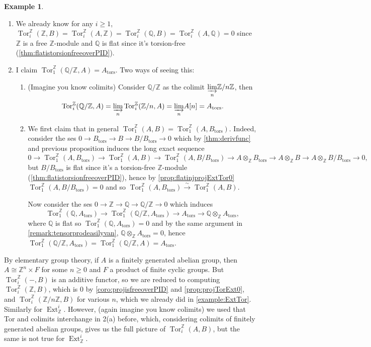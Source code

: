 \documentclass{article}
\newcommand{\Z}{\mathbb{Z}}
\newcommand{\Q}{\mathbb{Q}}
\newcommand{\tors}{{\operatorname{tors}}}
\newcommand{\Tor}{\operatorname{Tor}}
\newcommand{\Ext}{\operatorname{Ext}}
\theoremstyle{definition}
\newtheorem{example}[defn]{Example}
\begin{document}
\begin{example}
\begin{enumerate}
\item We already know for any $i\geq 1$, $\Tor_i^\Z(\Z,B)=\Tor_i^\Z(A,\Z)=\Tor_i^\Z(\Q,B)=\Tor_i^\Z(A,\Q)=0$ since $\Z$ is a free $\Z$-module and $\Q$ is flat since it's torsion-free (\ref{thm:flatistorsionfreeoverPID}).
\item I claim $\Tor_1^\Z(\Q/\Z,A)=A_\tors$. Two ways of seeing this:
\begin{enumerate}
\item (Imagine you know colimits) Consider $\Q/\Z$ as the colimit $\underset{n}{\varinjlim}\Z/n\Z$, then
\[
\Tor_i^\Z(\Q/\Z,A)=\underset{n}{\varinjlim}\Tor_i^\Z(\Z/n,A)=\underset{n}{\varinjlim}A[n]=A_\tors.
\]
\item We first claim that in general $\Tor_1^\Z(A,B)=\Tor_1^\Z(A,B_\tors)$. Indeed, consider the ses $0\rightarrow B_\tors\rightarrow B\rightarrow B/B_\tors \rightarrow 0$ which by \ref{thm:derivfunc} and previous proposition induces the long exact sequence
\[
0\rightarrow \Tor_1^\Z(A,B_\tors) \rightarrow \Tor_1^\Z(A,B) \rightarrow\Tor_1^\Z(A,B/B_\tors) \rightarrow A\otimes_\Z B_\tors \rightarrow A\otimes_\Z B\rightarrow A\otimes_\Z B/B_\tors \rightarrow 0,
\]
but $B/B_\tors$ is flat since it's a torsion-free $\Z$-module (\ref{thm:flatistorsionfreeoverPID}), hence by \ref{prop:flatinjprojExtTor0} $\Tor_1^\Z(A,B/B_\tors)=0$ and so $\Tor_1^\Z(A,B_\tors) \xrightarrow{\sim} \Tor_1^\Z(A,B)$.

Now consider the ses $0\rightarrow\Z\rightarrow\Q\rightarrow\Q/\Z\rightarrow 0$ which induces
\[
\Tor_1^\Z(\Q,A_\tors)\rightarrow\Tor_1^\Z(\Q/\Z,A_\tors)\rightarrow A_\tors\rightarrow \Q\otimes_\Z A_\tors,
\]
where $\Q$ is flat so $\Tor_1^\Z(\Q,A_\tors)=0$ and by the same argument in \ref{remark:tensorprodeasilyvan}, $\Q\otimes_\Z A_\tors=0$, hence $\Tor_1^\Z(\Q/\Z,A_\tors)=\Tor_1^\Z(\Q/\Z,A)=A_\tors$.
\end{enumerate}
\end{enumerate}
\end{example}

By elementary group theory, if $A$ is a finitely generated abelian group, then $A\cong\Z^n\times F$ for some $n\geq 0$ and $F$ a product of finite cyclic groups. But $\Tor_i^\Z(-,B)$ is an additive functor, so we are reduced to computing $\Tor_i^\Z(\Z,B)$, which is 0 by \ref{coro:projisfreeoverPID} and \ref{prop:projTorExt0}, and $\Tor_i^\Z(\Z/n\Z,B)$ for various $n$, which we already did in \ref{example:ExtTor}. Similarly for $\Ext_\Z^i$. However, (again imagine you know colimits) we used that Tor and colimits interchange in 2(a) before, which, considering colimits of finitely generated abelian groups, gives us the full picture of $\Tor_i^\Z(A,B)$, but the same is not true for $\Ext_\Z^i$.
\end{document}

